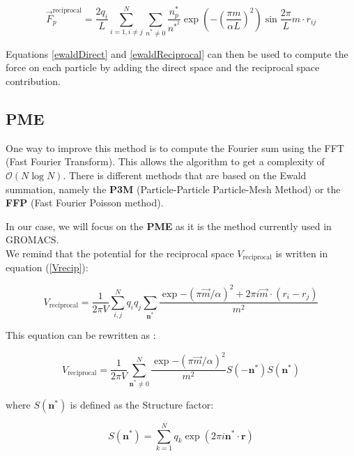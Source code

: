 \documentclass[10pt,twoside,a4paper]{report}
\begin{document}
\begin{equation}
\label{ewaldReciprocal}
   \overrightarrow{F}_p^{\text{reciprocal}} = \frac{2 q_i}{L} \sum\limits_{i=1,i\neq j}^N \sum_{n^* \neq 0} \frac{n_p^*}{n^{*^2}} \exp{(-(\frac{\pi m}{\alpha L})^2)}\sin{\frac{2\pi}{L} m \cdot r_{ij} }
\end{equation}

Equations \ref{ewaldDirect} and \ref{ewaldReciprocal} can then be used to compute the force on each particle by adding the direct space and the reciprocal space contribution.\\


\subsection{PME}

One way to improve this method is to compute the Fourier sum using the FFT (Fast Fourier Transform). This allows the algorithm to get a complexity of $\mathcal{O}(N\log N)$. There is different methods that are based on the Ewald summation, namely the \textbf{P3M} (Particle-Particle Particle-Mesh Method) or the \textbf{FFP} (Fast Fourier Poisson method). 

In our case, we will focus on the \textbf{PME} as it is the method currently used in GROMACS. \\

We remind that the potential for the reciprocal space $V_{\text{reciprocal}}$ is written in equation (\ref{Vrecip}):


\begin{equation*}
    V_{\text{reciprocal}} =\frac{1}{2 \pi V} \sum\limits_{i,j}^{N} q_i q_j \sum\limits_{\textbf{n}^*} \frac{\exp{-(\pi \overrightarrow{m}/\alpha)^2} +2\pi i \overrightarrow{m} \cdot (r_i - r_j)}{m^2}    
\end{equation*}



This equation can be rewritten as :

\begin{equation*}
    V_{\text{reciprocal}} =\frac{1}{2 \pi V} \sum\limits_{\textbf{n}^* \neq 0}^{N}  \frac{\exp{-(\pi \overrightarrow{m}/\alpha)^2}}{m^2}S(-\textbf{n}^* )S(\textbf{n}^* )
\end{equation*}

where $S(\textbf{n}^* )$ is defined as the Structure factor:

\begin{equation}
    S(\textbf{n}^* ) = \sum\limits_{k=1}^{N} {q_k \exp(2 \pi i \textbf{n}^* \cdot \textbf{r}) }
\end{equation}
\end{document}
